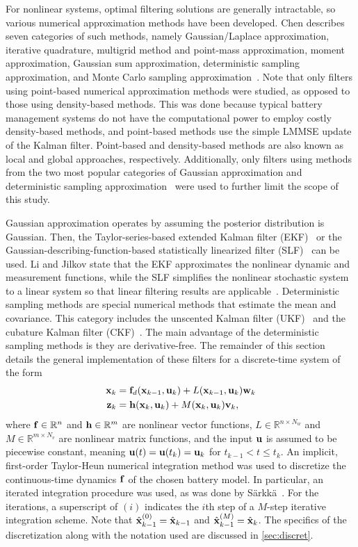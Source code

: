 \documentclass[../zhang_thesis.tex]{subfiles}
\begin{document}
For nonlinear systems, optimal filtering solutions are generally intractable, so various numerical approximation methods have been developed. Chen describes seven categories of such methods, namely Gaussian/Laplace approximation, iterative quadrature, multigrid method and point-mass approximation, moment approximation, Gaussian sum approximation, deterministic sampling approximation, and Monte Carlo sampling approximation~\cite{chen03}. Note that only filters using point-based
numerical approximation methods were studied, as opposed to those using density-based methods. This was done because typical battery management systems do not have the computational power to employ costly density-based methods, and point-based methods use the simple LMMSE update of the Kalman filter. Point-based and density-based methods are also known as local and global approaches, respectively. Additionally, only filters using methods from the two most popular categories of Gaussian
approximation and deterministic sampling approximation~\cite{li04} were used to further limit the scope of this study.

Gaussian approximation operates by assuming the posterior distribution is Gaussian. Then, the Taylor-series-based extended Kalman filter (EKF)~\cite{jazwinski70} or the Gaussian-describing-function-based statistically linearized filter (SLF)~\cite{gelb74} can be used. Li and Jilkov state that the EKF approximates the nonlinear dynamic and measurement functions, while the SLF simplifies the nonlinear stochastic system to a linear system so that linear filtering results are
applicable~\cite{li04}. Deterministic sampling methods are special numerical methods that estimate the mean and covariance. This category includes the unscented Kalman filter (UKF)~\cite{julier97} and the cubature Kalman filter (CKF)~\cite{arasaratnam10}. The main advantage of the deterministic sampling methods is they are derivative-free. The remainder of this section details the general implementation of these filters for a discrete-time system of the form
\begin{align}
    \mathbf{x}_k &= \mathbf{f}_d(\mathbf{x}_{k-1},\mathbf{u}_k) + L(\mathbf{x}_{k-1},\mathbf{u}_k) \mathbf{w}_k \label{eq:dtsys_x} \\
    \mathbf{z}_k &= \mathbf{h}(\mathbf{x}_k,\mathbf{u}_k) + M(\mathbf{x}_k,\mathbf{u}_k) \mathbf{v}_k, \label{eq:dtsys_z}
\end{align}
where $\mathbf{f}\in\mathbb{R}^n$ and $\mathbf{h}\in\mathbb{R}^m$ are nonlinear vector functions, $L\in\mathbb{R}^{n\times N_w}$ and $M\in\mathbb{R}^{m\times N_v}$ are nonlinear matrix functions, and the input $\mathbf{u}$ is assumed to be piecewise constant, meaning $\mathbf{u}(t)=\mathbf{u}(t_k)=\mathbf{u}_k$ for $t_{k-1}<t\le t_k$. An implicit, first-order Taylor-Heun numerical integration method was used to discretize the continuous-time dynamics $\mathbf{f}$ of the chosen battery model. In particular, an iterated integration
procedure was used, as was done by S\"arkk\"a~\cite{sarkka12}. For the iterations, a superscript of $(i)$ indicates the $i$th step of a $M$-step iterative integration scheme. Note that $\hat{\mathbf{x}}^{(0)}_{k-1}=\hat{\mathbf{x}}_{k-1}$ and $\hat{\mathbf{x}}^{(M)}_{k-1}=\hat{\mathbf{x}}_k$. The specifics of the discretization along with the notation used are discussed in \cref{sec:discret}.
\end{document}
